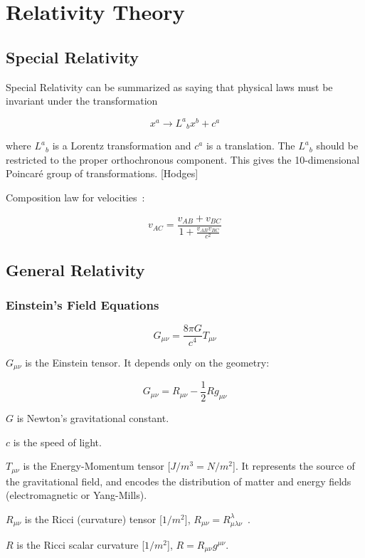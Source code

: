 \chapter{Relativity Theory}

\section{Special Relativity}

Special Relativity can be summarized as saying that physical
laws must be invariant under the transformation

\begin{equation}
x^a \rightarrow {L^a}_b x^b + c^a         \label{eq:Poincare}
\end{equation}

where ${L^a}_b$ is a Lorentz transformation and $c^a$ is a translation.  The ${L^a}_b$ should be restricted to the proper orthochronous component. This gives the 10-dimensional Poincaré group of transformations. [Hodges]

Composition law for velocities~\cite{dInverno}:

\[
v_{AC} = \frac{v_{AB} + v_{BC}}{1+\frac{v_{AB}v_{BC}}{c^2}}
\]


\section{General Relativity}

\subsection{Einstein's Field Equations}

\[
G_{\mu\nu}=\frac{8\pi G}{c^{4}}T_{\mu\nu}
\]

$G_{\mu\nu}$ is the Einstein tensor. It depends only on the geometry:

\[
G_{\mu\nu}=R_{\mu\nu}-\frac{1}{2}Rg_{\mu\nu}
\]

$G$ is Newton's gravitational constant.

$c$ is the speed of light.

$T_{\mu\nu}$ is the Energy-Momentum tensor [$J/m^3=N/m^2$]. It represents the source of the gravitational field, and encodes the distribution of matter and energy fields (electromagnetic or Yang-Mills).

$R_{\mu\nu}$ is the Ricci (curvature) tensor [$1/m^2$], $R_{\mu\nu} = R^{\lambda}_{\mu\lambda\nu}$\ .

$R$ is the Ricci scalar curvature [$1/m^2$], $R = R_{\mu\nu}g^{\mu\nu}$.

